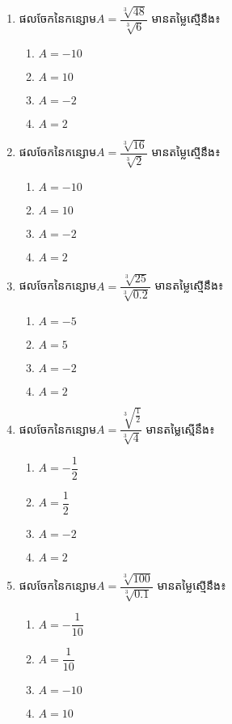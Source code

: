 \begin{enumerate}
\item ផលចែកនៃកន្សោម$A=\dfrac{\sqrt[3]{48}}{\sqrt[3]{6}}$  មានតម្លៃស្មើនឹង៖
\begin{multicols}{4}
\begin{enumerate}[label=\alph*.]
	\item $A=-10$
	\item $A=10$
	\item $A=-2$
	\item $A=2$
\end{enumerate}
\end{multicols}
\item ផលចែកនៃកន្សោម$A=\dfrac{\sqrt[3]{16}}{\sqrt[3]{2}}$  មានតម្លៃស្មើនឹង៖
\begin{multicols}{4}
\begin{enumerate}[label=\alph*.]
	\item $A=-10$
	\item $A=10$
	\item $A=-2$
	\item $A=2$
\end{enumerate}
\end{multicols}

\item ផលចែកនៃកន្សោម$A=\dfrac{\sqrt[3]{25}}{\sqrt[3]{0.2}}$  មានតម្លៃស្មើនឹង៖
\begin{multicols}{4}
\begin{enumerate}[label=\alph*.]
	\item $A=-5$
	\item $A=5$
	\item $A=-2$
	\item $A=2$
\end{enumerate}
\end{multicols}

\item ផលចែកនៃកន្សោម$A=\dfrac{\sqrt[3]{\frac{1}{2}}}{\sqrt[3]{4}}$  មានតម្លៃស្មើនឹង៖
\begin{multicols}{4}
\begin{enumerate}[label=\alph*.]
	\item $A=-\dfrac{1}{2}$
	\item $A=\dfrac{1}{2}$
	\item $A=-2$
	\item $A=2$
\end{enumerate}
\end{multicols}
\item ផលចែកនៃកន្សោម$A=\dfrac{\sqrt[3]{100}}{\sqrt[3]{0.1}}$  មានតម្លៃស្មើនឹង៖
\begin{multicols}{4}
\begin{enumerate}[label=\alph*.]
	\item $A=-\dfrac{1}{10}$
	\item $A=\dfrac{1}{10}$
	\item $A=-10$
	\item $A=10$
\end{enumerate}
\end{multicols}


\end{enumerate}
